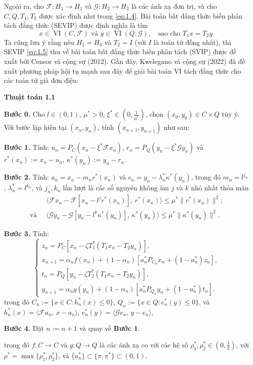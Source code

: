 \documentclass[11pt,a4paper]{article}
\theoremstyle{plain}
\theoremstyle{definition}
\theoremstyle{remark}
\numberwithin{equation}{section}
\newcommand{\Fc}{\mathcal{F}}
\newcommand{\Gc}{\mathcal{G}}
\newcommand{\inp}[2]{\langle #1,\,#2\rangle}
\newcommand{\nm}[1]{\lVert #1\rVert}
\DeclareMathOperator{\VI}{VI}
\newenvironment{algobox}[1]
  {\par\medskip\noindent\textbf{#1}\par\vspace{-2pt}\noindent\hrulefill\par\nopagebreak\vspace{2pt}}
  {\par\noindent\hrulefill\par\medskip}
\begin{document}
Ngoài ra, cho $\Fc:H_1\to H_1$ và $\Gc:H_2\to H_2$ là các ánh xạ đơn trị, và cho $C,Q,T_1,T_2$ được xác định như trong \eqref{eq:1.4}. Bài toán bất đẳng thức biến phân tách đẳng thức (SEVIP) được định nghĩa là tìm
\begin{equation}
x\in \VI(C,\Fc) \text{ và } y\in \VI(Q,\Gc),\quad \text{sao cho } T_1x=T_2y. \label{eq:1.5}
\end{equation}
Ta cũng lưu ý rằng nếu $H_2=H_3$ và $T_2=I$ (với $I$ là toán tử đồng nhất), thì SEVIP \eqref{eq:1.5} thu về bài toán bất đẳng thức biến phân tách (SVIP) được đề xuất bởi Censor và cộng sự (2012). Gần đây, Kwelegano và cộng sự (2022) đã đề xuất phương pháp hội tụ mạnh sau đây để giải bài toán VI tách đẳng thức cho các toán tử giả đơn điệu:

\begin{algobox}{Thuật toán 1.1}
\textbf{Bước 0.} Cho $l\in(0,1)$, $\mu^{*}>0$, $\xi^{*}\in(0,\tfrac{1}{\mu^{*}})$, chọn $(x_0,y_0)\in C\times Q$ tùy ý. Với bước lặp hiện tại $(x_n,y_n)$, tính $(x_{n+1},y_{n+1})$ như sau;

\smallskip
\textbf{Bước 1.} Tính: $u_n=P_C(x_n-\xi^{*}\Fc x_n)$, $r_n=P_Q(y_n-\xi^{*}\Gc y_n)$ và $r^{*}(x_n):=x_n-u_n$, $\kappa^{*}(y_n):=y_n-r_n$.

\smallskip
\textbf{Bước 2.} Tính: $a_n=x_n-m_n r^{*}(x_n)$ và $e_n=y_n-\lambda_n^{*}\kappa^{*}(y_n)$, trong đó $m_n=l^{j_n}$, $\lambda_n^{*}=l^{k_n}$, và $j_n,k_n$ lần lượt là các số nguyên không âm $j$ và $k$ nhỏ nhất thỏa mãn
\begin{align*}
&\inp{\Fc x_n-\Fc[x_n-l^{j}r^{*}(x_n)]}{r^{*}(x_n)}\le \mu^{*}\nm{r^{*}(x_n)}^2;\\
\text{và }\ &\inp{\Gc y_n-\Gc[y_n-l^{k}\kappa^{*}(y_n)]}{\kappa^{*}(y_n)}\le \mu^{*}\nm{\kappa^{*}(y_n)}^2.
\end{align*}

\smallskip
\textbf{Bước 3.} Tính:
\[
\begin{cases}
z_n=P_C[x_n-\zeta T_1^{*}(T_1x_n-T_2y_n)],\\
x_{n+1}=\alpha_n f(x_n)+(1-\alpha_n)[a_n^{*}P_{C_n}x_n+(1-a_n^{*})z_n],\\
t_n=P_Q[y_n-\zeta T_2^{*}(T_1x_n-T_2y_n)],\\
y_{n+1}=\alpha_n g(y_n)+(1-\alpha_n)[a_n^{*}P_{Q_n}y_n+(1-a_n^{*})t_n].
\end{cases}
\]
trong đó $C_n:=\{x\in C:h_n^{*}(x)\le 0\}$, $Q_n:=\{x\in Q:e_n^{*}(y)\le 0\}$, và $h_n^{*}(x)=\inp{\Fc a_n}{x-a_n}$, $e_n^{*}(y)=\inp{\Gc e_n}{y-e_n}$,

\smallskip
\textbf{Bước 4.} Đặt $n:=n+1$ và quay về \textbf{Bước 1}.

\smallskip
trong đó $f:C\to C$ và $g:Q\to Q$ là các ánh xạ co với các hệ số $\rho_1^{*},\rho_2^{*}\in(0,\tfrac{1}{2})$, với $\rho^{*}=\max\{\rho_1^{*},\rho_2^{*}\}$, và $\{a_n^{*}\}\subset\{\pi,\pi^{*}\}\subset(0,1)$.
\end{algobox}
\end{document}
